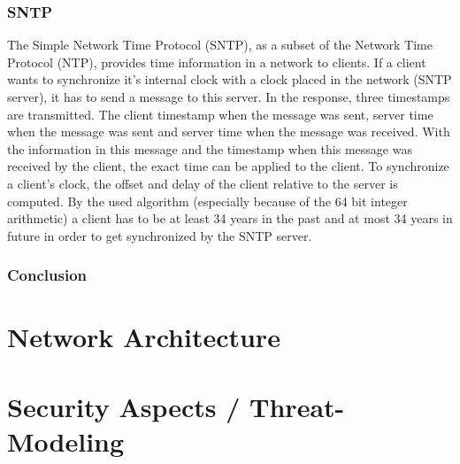 \subsubsection{SNTP}
The Simple Network Time Protocol (SNTP), as a subset of the Network Time Protocol (NTP), provides time information in a network to clients. If a client wants to synchronize it's internal clock with a clock placed in the network (SNTP server), it has to send a message to this server. In the response, three timestamps are transmitted. The client timestamp when the message was sent, server time when the message was sent and server time when the message was received. With the information in this message and the timestamp when this message was received by the client, the exact time can be applied to the client\cite{sntp}. To synchronize a client's clock, the offset and delay of the client relative to the server is computed. By the used algorithm (especially because of the 64 bit integer arithmetic) a client has to be at least 34 years in the past and at most 34 years in future in order to get synchronized by the SNTP server\cite{rfc5905}.


\subsubsection{Conclusion}

\section{Network Architecture}


\section{Security Aspects / Threat-Modeling}
